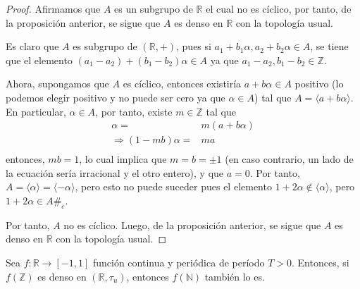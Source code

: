 \documentclass[12pt]{report}
\theoremstyle{largebreak}
\newcommand\cf[3]{\ensuremath{#1:#2\rightarrow#3}}
\newcommand\contradiction{\ensuremath{\#_c}}
\newcommand\gen[1]{\ensuremath{\langle#1\rangle}}
\begin{document}
    \begin{proof}
        Afirmamos que $A$ es un subgrupo de $\mathbb{R}$ el cual no es cíclico, por tanto, de la proposición anterior, se sigue que $A$ es denso en $\mathbb{R}$ con la topología usual.

        Es claro que $A$ es subgrupo de $(\mathbb{R},+)$, pues si $a_1+b_1\alpha,a_2+b_2\alpha\in A$, se tiene que el elemento $(a_1-a_2)+(b_1-b_2)\alpha\in A$ ya que $a_1-a_2,b_1-b_2\in\mathbb{Z}$.

        Ahora, supongamos que $A$ es cíclico, entonces existiría $a+b\alpha\in A$ positivo (lo podemos elegir positivo y no puede ser cero ya que $\alpha\in A$) tal que $A=\gen{a+b\alpha}$. En particular, $\alpha\in A$, por tanto, existe $m\in\mathbb{Z}$ tal que
        \begin{equation*}
            \begin{split}
                \alpha=&m(a+b\alpha)\\
                \Rightarrow (1-mb)\alpha=&ma\\
            \end{split}
        \end{equation*}
        entonces, $mb=1$, lo cual implica que $m=b=\pm 1$ (en caso contrario, un lado de la ecuación sería irracional y el otro entero), y que $a=0$. Por tanto, $A=\gen{\alpha}=\gen{-\alpha}$, pero esto no puede suceder pues el elemento $1+2\alpha\notin\gen{\alpha}$, pero $1+2\alpha\in A$\contradiction.

        Por tanto, $A$ no es cíclico. Luego, de la proposición anterior, se sigue que $A$ es denso en $\mathbb{R}$ con la topología usual.
    \end{proof}
    
    \begin{propo}
        Sea $\cf{f}{\mathbb{R}}{[-1,1]}$ función continua y periódica de período $T>0$. Entonces, si $f(\mathbb{Z})$ es denso en $(\mathbb{R},\tau_u)$, entonces $f(\mathbb{N})$ también lo es.
    \end{propo}
\end{document}
